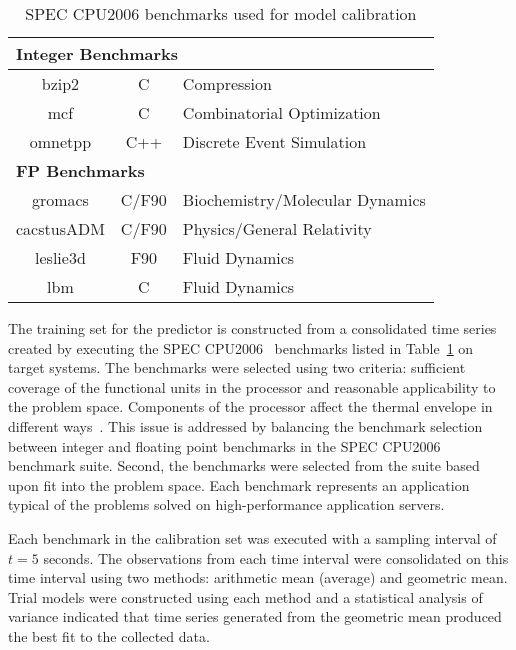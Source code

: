 \begin{table}[t!]
  \centering
  \caption{SPEC CPU2006 benchmarks used for model calibration}
  \label{tab:specbenchs}
  \begin{tabular}{c c p{5cm}}
    \hline
    \multicolumn{3}{l}{\textbf{Integer Benchmarks}} \\
    \hline
    bzip2&C&Compression\\
    mcf&C&Combinatorial Optimization\\
    omnetpp&C++&Discrete Event Simulation\\
    \multicolumn{3}{l}{\textbf{FP Benchmarks}} \\
    \hline
    gromacs&C/F90&Biochemistry/Molecular Dynamics\\
    cacstusADM&C/F90&Physics/General Relativity\\
    leslie3d&F90&Fluid Dynamics\\
    lbm&C&Fluid Dynamics\\
    \hline
  \end{tabular}
\end{table}
The training set for the predictor is constructed from a consolidated
time series created by executing the SPEC CPU2006~\cite{Henning2006}
benchmarks listed in Table~\ref{tab:specbenchs} on target systems.  The
benchmarks were selected using two criteria: sufficient coverage of the
functional units in the processor and reasonable applicability to the
problem space.  Components of the processor affect the thermal envelope
in different ways~\cite{Kumar2008}.  This issue is addressed by
balancing the benchmark selection between integer and floating point
benchmarks in the SPEC CPU2006 benchmark suite.  Second, the benchmarks
were selected from the suite based upon fit into the problem space.
Each benchmark represents an application typical of the problems solved
on high-performance application servers.  

Each benchmark in the calibration set was executed with a sampling
interval of $t=5$ seconds.  The observations from each time interval
were consolidated on this time interval using two methods: arithmetic
mean (average) and geometric mean.  Trial models were constructed using
each method and a statistical analysis of variance indicated that time
series generated from the geometric mean
produced the best fit to the collected data.
   
